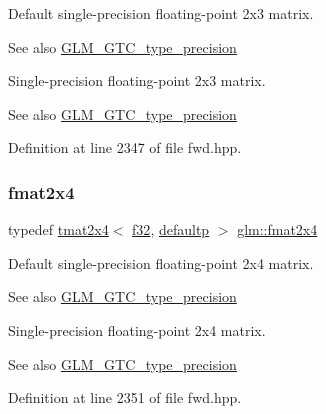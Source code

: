 Default single-\/precision floating-\/point 2x3 matrix. \begin{DoxySeeAlso}{See also}
\mbox{\hyperlink{group__gtc__type__precision}{G\+L\+M\+\_\+\+G\+T\+C\+\_\+type\+\_\+precision}}
\end{DoxySeeAlso}
Single-\/precision floating-\/point 2x3 matrix. \begin{DoxySeeAlso}{See also}
\mbox{\hyperlink{group__gtc__type__precision}{G\+L\+M\+\_\+\+G\+T\+C\+\_\+type\+\_\+precision}} 
\end{DoxySeeAlso}


Definition at line 2347 of file fwd.\+hpp.

\mbox{\label{group__gtc__type__precision_ga76578ee3c2d6de9b46d0efd1c7060b85}} 
\subsubsection{\texorpdfstring{fmat2x4}{fmat2x4}}
{\footnotesize\ttfamily typedef \mbox{\hyperlink{structglm_1_1tmat2x4}{tmat2x4}}$<$ \mbox{\hyperlink{group__gtc__type__precision_ga0ec999b57f5330d9021256e96038df04}{f32}}, \mbox{\hyperlink{namespaceglm_a0f04f086094c747d227af4425893f545a9d21ccd8b5a009ec7eb7677befc3bf51}{defaultp}} $>$ \mbox{\hyperlink{group__gtc__type__precision_ga76578ee3c2d6de9b46d0efd1c7060b85}{glm\+::fmat2x4}}}

Default single-\/precision floating-\/point 2x4 matrix. \begin{DoxySeeAlso}{See also}
\mbox{\hyperlink{group__gtc__type__precision}{G\+L\+M\+\_\+\+G\+T\+C\+\_\+type\+\_\+precision}}
\end{DoxySeeAlso}
Single-\/precision floating-\/point 2x4 matrix. \begin{DoxySeeAlso}{See also}
\mbox{\hyperlink{group__gtc__type__precision}{G\+L\+M\+\_\+\+G\+T\+C\+\_\+type\+\_\+precision}} 
\end{DoxySeeAlso}


Definition at line 2351 of file fwd.\+hpp.

\mbox{\label{group__gtc__type__precision_ga17dec8b2e3d19b235b0749b8ac9f2217}} 
